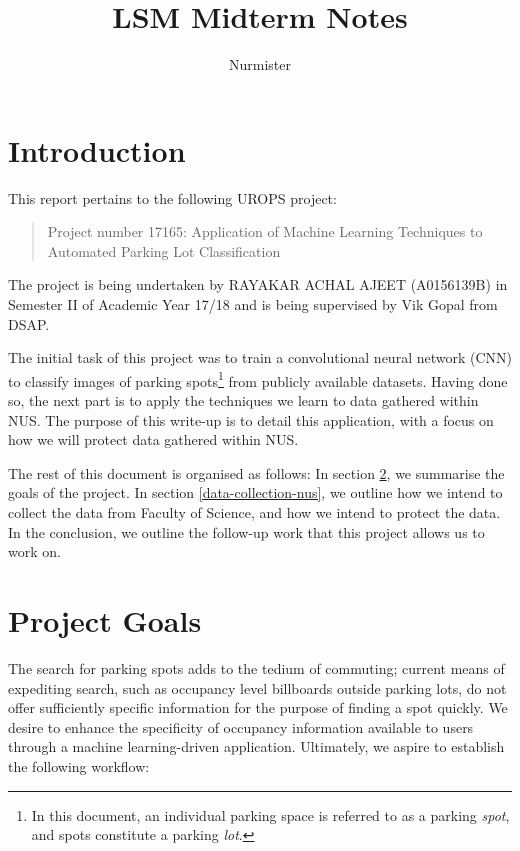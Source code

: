 \documentclass[]{article}
\title{\textbf{LSM Midterm Notes}}
\author{Nurmister}
\date{}
\let\rmarkdownfootnote\footnote%
\def\footnote{\protect\rmarkdownfootnote}
\begin{document}
\maketitle

{
\hypersetup{linkcolor=black}
\setcounter{tocdepth}{2}
\tableofcontents
}

\section{Introduction}

This report pertains to the following UROPS project:
\begin{quote}
Project number 17165: Application of
Machine Learning Techniques to Automated Parking Lot Classification
\end{quote}
The project is being undertaken by RAYAKAR ACHAL AJEET (A0156139B) in Semester II
of Academic Year 17/18 and is being supervised by Vik Gopal from DSAP. 

The initial task of this project was to train a convolutional neural network
(CNN) to classify images of parking spots\footnote{In this document, an
individual parking space is referred to as a parking \emph{spot}, and spots
constitute a parking \emph{lot}.} from publicly available datasets.  Having
done so, the next part is to apply the techniques we learn to data gathered
within NUS. The purpose of this write-up is to detail this application, with a
focus on how we will protect data gathered within NUS.

The rest of this document is organised as follows: In section
\ref{project-goals}, we summarise the goals of the project. In section
\ref{data-collection-nus}, we outline how we intend to collect the data from
Faculty of Science, and how we intend to protect the data. In the conclusion,
we outline the follow-up work that this project allows us to work on.

\section{Project Goals}
\label{project-goals}

The search for parking spots adds to the tedium of commuting; current
means of expediting search, such as occupancy level billboards outside
parking lots, do not offer sufficiently specific information for the
purpose of finding a spot quickly. We desire to enhance the specificity
of occupancy information available to users through a machine
learning-driven application. Ultimately, we aspire to establish the
following workflow: \newline
\end{document}
